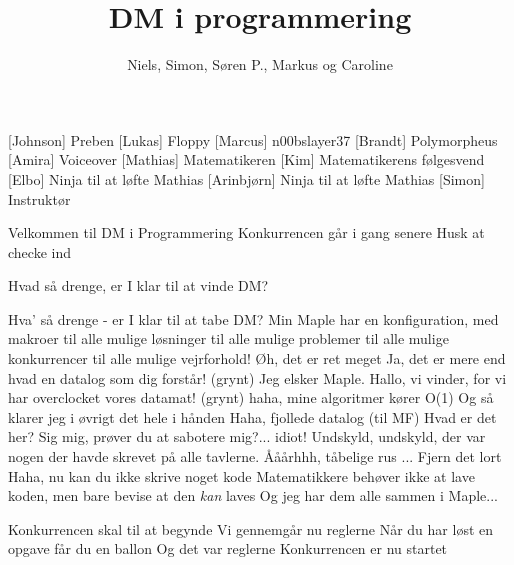\documentclass[a4paper,11pt]{article}
\title{DM i programmering}
\author{Niels, Simon, Søren P., Markus og Caroline}
\begin{document}
\maketitle

\begin{roles}
  [Johnson] Preben
  [Lukas] Floppy
  [Marcus] n00bslayer37
  [Brandt] Polymorpheus
  [Amira] Voiceover
  [Mathias] Matematikeren
  [Kim] Matematikerens følgesvend
  [Elbo] Ninja til at løfte Mathias
  [Arinbjørn] Ninja til at løfte Mathias
  [Simon] Instruktør
\end{roles}

\begin{sketch}

   Velkommen til DM i Programmering
   Konkurrencen går i gang senere
   Husk at checke ind

   Hvad så drenge, er I klar til at vinde DM?

   Hva' så drenge - er I klar til at tabe DM?
   Min Maple har en konfiguration, med makroer til alle mulige løsninger til alle mulige problemer til alle mulige konkurrencer til alle mulige vejrforhold!
   Øh, det er ret meget
   Ja, det er mere end hvad en datalog som dig forstår!
   (grynt) Jeg elsker Maple.
   Hallo, vi vinder, for vi har overclocket vores datamat!
   (grynt) haha, mine algoritmer kører O(1)
   Og så klarer jeg i øvrigt det hele i hånden
   Haha, fjollede datalog
   (til MF) Hvad er det her? Sig mig, prøver du at sabotere mig?... idiot!
   Undskyld, undskyld, der var nogen der havde skrevet på alle tavlerne.
   Ååårhhh, tåbelige rus ... Fjern det lort
   Haha, nu kan du ikke skrive noget kode
   Matematikkere behøver ikke at lave koden, men bare bevise at den \emph{kan} laves
   Og jeg har dem alle sammen i Maple...

   Konkurrencen skal til at begynde
   Vi gennemgår nu reglerne
   Når du har løst en opgave får du en ballon
   Og det var reglerne
   Konkurrencen er nu startet


\end{sketch}
\end{document}
